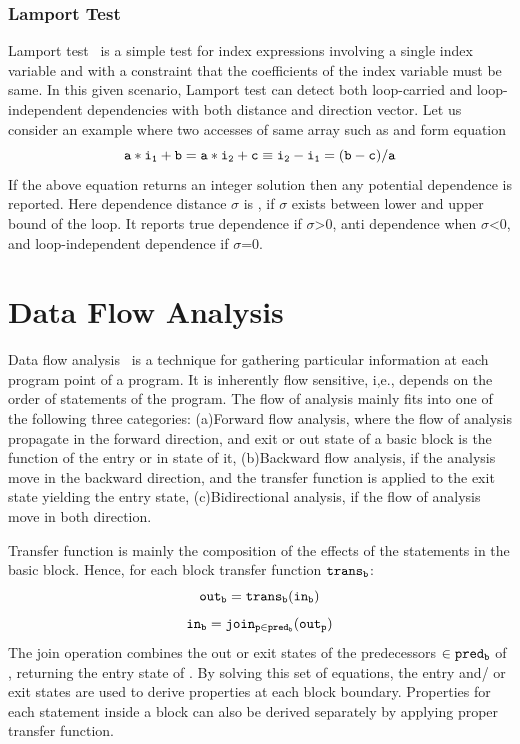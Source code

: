 \subsubsection*{Lamport Test}
Lamport test~\cite{Lamport1974parallel} is a simple test for index expressions involving a single index variable and 
with a constraint that the coefficients of the index variable must be same. 
In this given scenario, Lamport test can detect both loop-carried and loop-
independent dependencies with both distance and direction vector. Let us consider an example where two accesses of same array such as  
and  form equation 
\[{\tt a*i_1+b = a*i_2+c \equiv i_2-i_1 = (b-c)/a}\]
If the above equation returns an integer solution then any potential dependence 
is reported. Here dependence distance $\sigma$ is , if $\sigma$ exists 
between lower and upper bound of the loop. It reports true dependence if $\sigma$>0, anti dependence when $\sigma$<0, and loop-independent dependence if 
$\sigma$=0.

\section{Data Flow Analysis}
Data flow analysis~\cite{Kam76globaldata, Muchnick97, Khedker09} is a technique for gathering particular information at 
each program point of a program. It is inherently flow sensitive, i,e., depends on the order of statements of the program. The flow of analysis mainly fits into one of the following 
three categories: (a)Forward flow analysis, where the flow of analysis 
propagate in the forward direction, and exit or out state of a basic block 
is the function of the entry or in state of it, (b)Backward flow analysis, if the analysis 
move in the backward direction, and the transfer function is applied to the exit 
state yielding the entry state, (c)Bidirectional analysis, if the flow of analysis 
move in both direction. 

Transfer function is mainly the composition of the effects of the statements in the 
basic block. Hence, for each block  transfer function ${\tt trans_b}$:
\[{\tt out_b = trans_b(in_b)}\]
\[{\tt in_b = join_{p\in{pred_b}}(out_p)}\]
The join operation combines the out or exit states of the predecessors ${\tt \in{pred_b}}$ of , 
returning the entry state of . 
By solving this set of equations, the entry and/ or exit states are used 
to derive properties at each block boundary. Properties for each statement 
inside a block can also be derived separately by applying proper transfer 
function.

